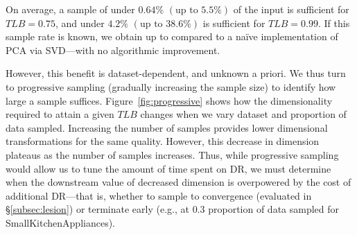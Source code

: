 On average, a sample of under $0.64\%$ $(\text{up to } 5.5\%)$ of the input is sufficient for $TLB = 0.75$, and under $4.2\%$ $(\text{up to } 38.6\%)$ is sufficient for $TLB=0.99$.  
If this sample rate is known, we obtain up to  compared to a na\"ive implementation of PCA via SVD---with no algorithmic improvement. 

However, this benefit is dataset-dependent, and unknown a priori.
We thus turn to progressive sampling (gradually increasing the sample size) to identify how large a sample suffices.
Figure~\ref{fig:progressive} shows how the dimensionality required to attain a given $TLB$ changes when we vary dataset and proportion of data sampled.
Increasing the number of samples provides lower dimensional transformations for the same quality.
However, this decrease in dimension plateaus as the number of samples increases.
Thus, while progressive sampling would allow us to tune the amount of time spent on DR, we must determine when the downstream value of decreased dimension is overpowered by the cost of additional DR---that is, whether to sample to convergence (evaluated in \S\ref{subsec:lesion}) or terminate early (e.g., at $0.3$ proportion of data sampled for SmallKitchenAppliances). 





